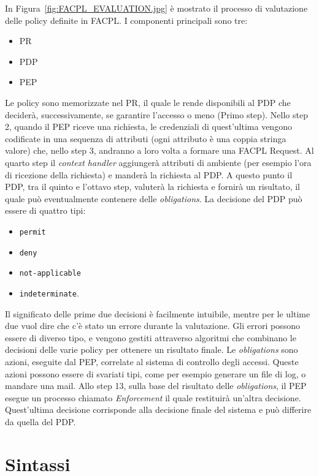 In Figura~\ref{fig:FACPL_EVALUATION.jpg} è mostrato il processo di valutazione delle policy definite in FACPL.
I componenti principali sono tre:
\begin{itemize}
\item{\acf{PR}}
\item{\acf{PDP}}
\item{\acf{PEP}}
\end{itemize}
Le policy sono memorizzate nel \ac{PR}, il quale le rende disponibili al \ac{PDP} che deciderà, successivamente, se garantire l'accesso o meno (Primo step).
Nello step 2, quando il \ac{PEP} riceve una richiesta, le credenziali di quest'ultima vengono codificate in una sequenza di attributi (ogni attributo è una coppia stringa valore) che, nello step 3, andranno a loro volta a formare una \ac{FACPL} Request.
Al quarto step il \textit{context handler} aggiungerà attributi di ambiente (per esempio l'ora di ricezione della richiesta) e manderà la richiesta al \ac{PDP}.
A questo punto il \ac{PDP}, tra il quinto e l'ottavo step, valuterà la richiesta e fornirà un risultato, il quale può eventualmente contenere delle \textit{obligations}.
La decisione del \ac{PDP} può essere di quattro tipi:
\begin{itemize}
\item \texttt{permit}
\item \texttt{deny}
\item \texttt{not-applicable} 
\item \texttt{indeterminate}.
\end{itemize}
Il significato delle prime due decisioni è facilmente intuibile, mentre per le ultime due vuol dire che c'è stato un errore durante la valutazione.
Gli errori possono essere di diverso tipo, e vengono gestiti attraverso algoritmi che combinano le decisioni delle varie policy per ottenere un risultato finale.
Le \textit{obligations} sono azioni, eseguite dal \ac{PEP}, correlate al sistema di controllo degli accessi. Queste azioni possono essere di svariati tipi, come per esempio generare un file di log, o mandare una mail.
Allo step 13, sulla base del risultato delle \textit{obligations}, il \ac{PEP} esegue un processo chiamato \textit{Enforcement} il quale restituirà un'altra decisione.
Quest'ultima decisione corrisponde alla decisione finale del sistema e può differire da quella del PDP.


\section{Sintassi}
\label{sec:facpl_syntax}

